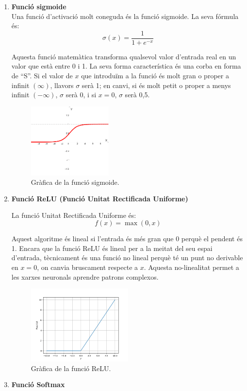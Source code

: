 \begin{enumerate}
    \item \label{sigmoide}{\textbf{Funció sigmoide}}\\
    Una funció d'activació molt coneguda és la funció sigmoide. La seva fórmula és:
    $$ \sigma(x) = \frac{1}{1 + e^{-x}} $$

    Aquesta funció matemàtica transforma qualsevol valor d'entrada real en un valor que està entre 0 i 1. La seva forma característica és una corba en forma de ``S''. Si el valor de $x$ que introduïm a la funció és molt gran o proper a infinit $(\infty)$, llavors $\sigma$ serà 1; en canvi, si és molt petit o proper a menys infinit $(-\infty)$, $\sigma$ serà 0, i si $x = 0$, $\sigma$ serà 0,5.

    \begin{figure}[H]
        \centering
        \includegraphics[width=0.4\textwidth]{./figures/grafica_sigmoide.png}
        \caption{Gràfica de la funció sigmoide.~\cite{Img_sigmoide}}
    \end{figure}

    \item \hypertarget{subsec:1}{\textbf{Funció ReLU (Funció Unitat Rectificada Uniforme)}}

    La funció Unitat Rectificada Uniforme és:
    $$f(x) = \max(0, x)$$


    Aquest algoritme és lineal si l'entrada és més gran que 0 perquè el pendent és 1. Encara que la funció ReLU és lineal per a la meitat del seu espai d'entrada, tècnicament és una funció no lineal perquè té un punt no derivable en $x = 0$, on canvia bruscament respecte a $x$. Aquesta no-linealitat permet a les xarxes neuronals aprendre patrons complexos.
    \begin{figure}[H]
        \centering
        \includegraphics[width=0.5\textwidth]{./figures/ReLU.png}
        \caption{Gràfica de la funció ReLU.~\cite{FuncioD'activacio}}
    \end{figure}
\clearpage
    \item \textbf{Funció Softmax}


\end{enumerate}

